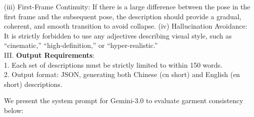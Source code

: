\documentclass{llmxive}
\begin{document}
\begin{tcolorbox}[
    colback=gray!10,
    colframe=gray!30,
    boxrule=0.3pt,
    arc=1.5pt,
    left=6pt,
    right=6pt,
    top=6pt,
    bottom=6pt
]
            (iii) First-Frame Continuity: If there is a large difference between the pose in the first frame and the subsequent pose, the description should provide a gradual, coherent, and smooth transition to avoid collapse.
            (iv) Hallucination Avoidance: It is strictly forbidden to use any adjectives describing visual style, such as ``cinematic,'' ``high-definition,'' or ``hyper-realistic.''
\\
III. \textbf{Output Requirements}:
\\
1. Each set of descriptions must be strictly limited to within 150 words.
\\
2. Output format: JSON, generating both Chinese (cn short) and English (en short) descriptions.
\end{tcolorbox}


We present the system prompt for Gemini-3.0 to evaluate garment consistency below:
% 
\end{document}
